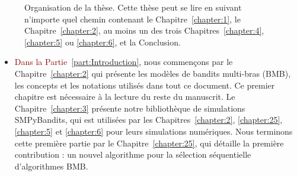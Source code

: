\begin{resume_fr}
\begin{figure}[h!]
{
    }
    \caption[Organisation de la thèse : une carte de lecture.]{Organisation de la thèse. Cette thèse peut se lire en suivant n'importe quel chemin contenant le Chapitre~\ref{chapter:1}, le Chapitre~\ref{chapter:2}, au moins un des trois Chapitres~\ref{chapter:4}, \ref{chapter:5} ou \ref{chapter:6}, et la Conclusion.}
    \label{fig:1:organization_fr}
\end{figure}

\begin{itemize}
    \item
\textcolor{darkred}{Dans la Partie~\ref{part:Introduction}}, nous commençons par le Chapitre~\ref{chapter:2} qui présente les modèles de bandits multi-bras (BMB), les concepts et les notations utilisés dans tout ce document. Ce premier chapitre est nécessaire à la lecture du reste du manuscrit.
Le Chapitre~\ref{chapter:3} présente notre bibliothèque de simulations SMPyBandits, qui est utilisées par les Chapitres~\ref{chapter:2}, \ref{chapter:25}, \ref{chapter:5} et \ref{chapter:6} pour leurs simulations numériques.
Nous terminons cette première partie par le Chapitre~\ref{chapter:25},
qui détaille la première contribution : un nouvel algorithme pour la sélection séquentielle d'algorithmes BMB.


\end{itemize}
\end{resume_fr}
